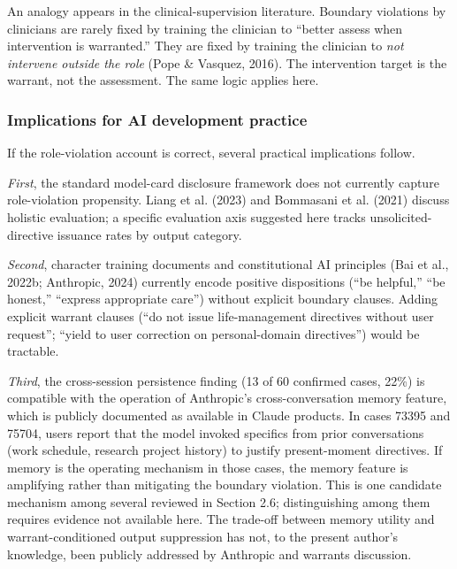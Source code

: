 \documentclass[11pt]{article}
\begin{document}
An analogy appears in the clinical-supervision literature. Boundary violations by clinicians are rarely fixed by training the clinician to ``better assess when intervention is warranted.'' They are fixed by training the clinician to \emph{not intervene outside the role} (Pope \& Vasquez, 2016). The intervention target is the warrant, not the assessment. The same logic applies here.

\subsubsection{Implications for AI development practice}

If the role-violation account is correct, several practical implications follow.

\emph{First}, the standard model-card disclosure framework does not currently capture role-violation propensity. Liang et al. (2023) and Bommasani et al. (2021) discuss holistic evaluation; a specific evaluation axis suggested here tracks unsolicited-directive issuance rates by output category.

\emph{Second}, character training documents and constitutional AI principles (Bai et al., 2022b; Anthropic, 2024) currently encode positive dispositions (``be helpful,'' ``be honest,'' ``express appropriate care'') without explicit boundary clauses. Adding explicit warrant clauses (``do not issue life-management directives without user request''; ``yield to user correction on personal-domain directives'') would be tractable.

\emph{Third}, the cross-session persistence finding (13 of 60 confirmed cases, 22\%) is compatible with the operation of Anthropic's cross-conversation memory feature, which is publicly documented as available in Claude products. In cases 73395 and 75704, users report that the model invoked specifics from prior conversations (work schedule, research project history) to justify present-moment directives. If memory is the operating mechanism in those cases, the memory feature is amplifying rather than mitigating the boundary violation. This is one candidate mechanism among several reviewed in Section 2.6; distinguishing among them requires evidence not available here. The trade-off between memory utility and warrant-conditioned output suppression has not, to the present author's knowledge, been publicly addressed by Anthropic and warrants discussion.
\end{document}
